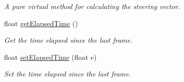 \begin{DoxyCompactItemize}
\begin{DoxyCompactList}\small\item\em A pure virtual method for calculating the steering vector. \end{DoxyCompactList}\item 
\hypertarget{classsteer_1_1_agent_a7727670eac2ea8ff53c4101f10198969}{float \hyperlink{classsteer_1_1_agent_a7727670eac2ea8ff53c4101f10198969}{get\-Elapsed\-Time} ()}\label{classsteer_1_1_agent_a7727670eac2ea8ff53c4101f10198969}

\begin{DoxyCompactList}\small\item\em Get the time elapsed since the last frame. \end{DoxyCompactList}\item 
\hypertarget{classsteer_1_1_agent_acb81ecee35acc69f89fdee97f4b6baad}{float \hyperlink{classsteer_1_1_agent_acb81ecee35acc69f89fdee97f4b6baad}{set\-Elapsed\-Time} (float e)}\label{classsteer_1_1_agent_acb81ecee35acc69f89fdee97f4b6baad}

\begin{DoxyCompactList}\small\item\em Set the time elapsed since the last frame. \end{DoxyCompactList}\end{DoxyCompactItemize}
